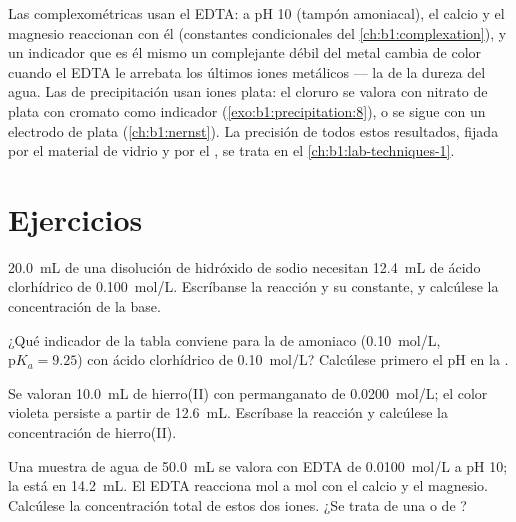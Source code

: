 Las  complexométricas usan el EDTA: a pH 10 (tampón
amoniacal), el calcio y el magnesio reaccionan con él 
(constantes condicionales del \cref{ch:b1:complexation}), y un indicador
que es él mismo un complejante débil del metal cambia de color cuando el
EDTA le arrebata los últimos iones metálicos --- la  de la
dureza del agua. Las  de precipitación usan iones plata: el
cloruro se valora con nitrato de plata con cromato como indicador
(\cref{exo:b1:precipitation:8}), o se sigue con un electrodo de plata
(\cref{ch:b1:nernst}). La precisión de todos estos resultados, fijada por
el material de vidrio y por el , se trata en el
\cref{ch:b1:lab-techniques-1}.

\section{Ejercicios}

\begin{exercise}[$\star$]\label{exo:b1:titration-methods:1}
\qty{20.0}{mL} de una disolución de hidróxido de sodio necesitan
\qty{12.4}{mL} de ácido clorhídrico de \qty{0.100}{mol/L}. Escríbanse la
reacción y su constante, y calcúlese la concentración de la base.
\end{exercise}

\begin{exercise}[$\star$]\label{exo:b1:titration-methods:2}
¿Qué indicador de la tabla conviene para la  de amoniaco
(\qty{0.10}{mol/L}, $\mathrm{p}K_a = 9.25$) con ácido clorhídrico de
\qty{0.10}{mol/L}? Calcúlese primero el pH en la .
\end{exercise}

\begin{exercise}[$\star$]\label{exo:b1:titration-methods:3}
Se valoran \qty{10.0}{mL} de hierro(II) con permanganato de
\qty{0.0200}{mol/L}; el color violeta persiste a partir de
\qty{12.6}{mL}. Escríbase la reacción y calcúlese la concentración de
hierro(II).
\end{exercise}

\begin{exercise}[$\star$]\label{exo:b1:titration-methods:4}
Una muestra de agua de \qty{50.0}{mL} se valora con EDTA de
\qty{0.0100}{mol/L} a pH 10; la  está en \qty{14.2}{mL}. El
EDTA reacciona mol a mol con el calcio y el magnesio. Calcúlese la
concentración total de estos dos iones. ¿Se trata de una  o de ?
\end{exercise}

